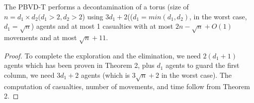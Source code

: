 \begin{theorem}
The PBVD-T performs a decontamination of a torus (size of $n=d_1\times d_2(d_1>2,d_2>2$) using $3d_1+2$(($d_1=min(d_1,d_2)$, in the worst case, $d_1=\sqrt{n}$) agents and at most 1 casualties with at most $2n-\sqrt{n}+O(1)$ movements and at most $\sqrt{n}+11$.
\end{theorem}
\begin{proof}
To complete the exploration and the elimination, we need $2(d_1+1)$ agents which has been proven in Theorem 2, plus  $d_1$ agents to guard the first column, we need $3d_1+2$ agents (which is $3\sqrt{n}+2$ in the worst case).  The computation of casualties,  number of movements, and   time   follow from Theorem 2.
\end{proof}






